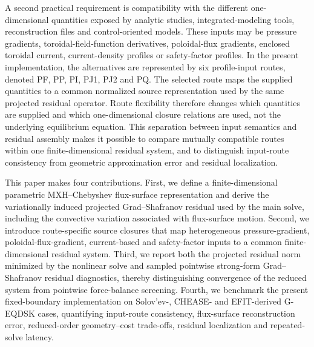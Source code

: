 \documentclass[final, 3p, times]{elsarticle}
\begin{document}
A second practical requirement is compatibility with the different one-dimensional quantities exposed by analytic studies, integrated-modeling tools, reconstruction files and control-oriented models. These inputs may be pressure gradients, toroidal-field-function derivatives, poloidal-flux gradients, enclosed toroidal current, current-density profiles or safety-factor profiles. In the present implementation, the alternatives are represented by six profile-input routes, denoted PF, PP, PI, PJ1, PJ2 and PQ. The selected route maps the supplied quantities to a common normalized source representation used by the same projected residual operator. Route flexibility therefore changes which quantities are supplied and which one-dimensional closure relations are used, not the underlying equilibrium equation. This separation between input semantics and residual assembly makes it possible to compare mutually compatible routes within one finite-dimensional residual system, and to distinguish input-route consistency from geometric approximation error and residual localization.

This paper makes four contributions. First, we define a finite-dimensional parametric MXH--Chebyshev flux-surface representation and derive the variationally induced projected Grad--Shafranov residual used by the main solve, including the convective variation associated with flux-surface motion. Second, we introduce route-specific source closures that map heterogeneous pressure-gradient, poloidal-flux-gradient, current-based and safety-factor inputs to a common finite-dimensional residual system. Third, we report both the projected residual norm minimized by the nonlinear solve and sampled pointwise strong-form Grad--Shafranov residual diagnostics, thereby distinguishing convergence of the reduced system from pointwise force-balance screening. Fourth, we benchmark the present fixed-boundary implementation on Solov'ev-, CHEASE- and EFIT-derived G-EQDSK cases, quantifying input-route consistency, flux-surface reconstruction error, reduced-order geometry--cost trade-offs, residual localization and repeated-solve latency.
\end{document}
